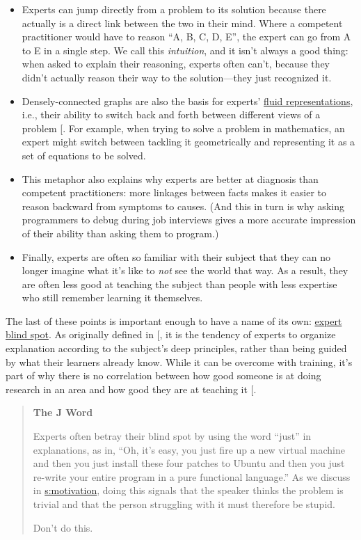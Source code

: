 \begin{itemize}
\item
  Experts can jump directly from a problem to its solution because
  there actually is a direct link between the two in their mind. Where
  a competent practitioner would have to reason ``A, B, C, D, E'', the
  expert can go from A to E in a single step. We call this
  \emph{intuition}, and it isn't always a good thing: when asked to explain
  their reasoning, experts often can't, because they didn't actually
  reason their way to the solution---they just recognized it.
\item
  Densely-connected graphs are also the basis for experts'
  \protect\hyperlink{g:fluid-representation}{fluid representations}, i.e.,
  their ability to switch back and forth between different views of a
  problem {[}\protect[\hyperlink{b:Petr2016}{Petr2016}]{]}. For example, when trying to solve a
  problem in mathematics, an expert might switch between tackling it
  geometrically and representing it as a set of equations to be
  solved.
\item
  This metaphor also explains why experts are better at diagnosis than
  competent practitioners: more linkages between facts makes it easier
  to reason backward from symptoms to causes. (And this in turn is why
  asking programmers to debug during job interviews gives a more
  accurate impression of their ability than asking them to program.)
\item
  Finally, experts are often so familiar with their subject that they
  can no longer imagine what it's like to \emph{not} see the world that
  way. As a result, they are often less good at teaching the subject
  than people with less expertise who still remember learning it
  themselves.
\end{itemize}

The last of these points is important enough to have a name of its own:
\protect\hyperlink{g:expert-blind-spot}{expert blind spot}. As originally
defined in {[}\protect[\hyperlink{b:Nath2003}{Nath2003}]{]}, it is the tendency of experts to organize
explanation according to the subject's deep principles, rather than
being guided by what their learners already know. While it can be
overcome with training, it's part of why there is no correlation between
how good someone is at doing research in an area and how good they are
at teaching it {[}\protect[\hyperlink{b:Mars2002}{Mars2002}]{]}.

\begin{quote}\setlength{\parindent}{0pt}
\textbf{The J Word}

Experts often betray their blind spot by using the word ``just'' in
explanations, as in, ``Oh, it's easy, you just fire up a new virtual
machine and then you just install these four patches to Ubuntu and
then you just re-write your entire program in a pure functional
language.'' As we discuss in \protect\hyperlink{CHAPTER}{s:motivation}, doing this
signals that the speaker thinks the problem is trivial and that the
person struggling with it must therefore be stupid.

Don't do this.
\end{quote}

